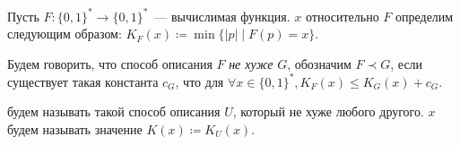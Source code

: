 






\begin{definition*}
    Пусть $F\colon \{0, 1\}^* \to \{0, 1\}^*$~--- вычислимая функция.  $x$
    относительно $F$ определим следующим образом: $K_F(x) \coloneqq \min\{|p| \mid F(p) = x\}$.

    Будем говорить, что способ описания $F$ \textit{не хуже} $G$, обозначим $F \prec G$, если существует
    такая константа $c_G$, что для $\forall x \in \{0, 1\}^*, K_F(x) \le K_G(x) +
    c_G$.

     будем называть такой способ описания $U$, который не хуже любого
    другого.  $x$ будем называть значение $K(x) \coloneqq K_U(x)$.
\end{definition*}


\breakline












